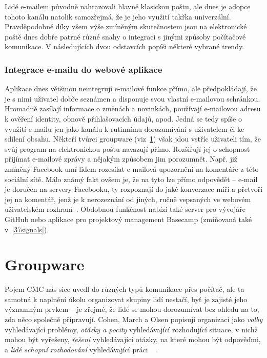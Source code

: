 \documentclass[12pt,oneside,final]{fithesis2}
\begin{document}
Lidé e-mailem původně nahrazovali hlavně klasickou poštu, ale dnes je adopce tohoto kanálu natolik samozřejmá, že je jeho využití takřka univerzální. Pravděpodobně díky všem výše zmíněným skutečnostem jsou na elektronické poště dnes dobře patrné různé snahy o integraci s jinými způsoby počítačové komunikace. V následujících dvou odstavcích popíši některé vybrané trendy.

\subsubsection*{Integrace e-mailu do webové aplikace}\label{emailWebApp}
Aplikace dnes většinou neintegrují e-mailové funkce přímo, ale předpokládají, že je s nimi uživatel dobře seznámen a disponuje svou vlastní e-mailovou schránkou. Hromadně zasílají informace o změnách a novinkách, používají e-mailovou adresu k ověření identity, obnově přihlašovacích údajů, apod. Jedná se tedy spíše o využití e-mailu jen jako kanálu k rutinnímu dorozumívání s uživatelem či ke sdílení obsahu. Někteří tvůrci groupware (viz~\ref{groupware}) však jdou vstříc uživateli tím, že svůj program na elektronickou poštu navazují přímo. Rozšiřují jej o schopnost přijímat e-mailové zprávy a nějakým způsobem jim porozumnět. Např. již zmíněný Facebook umí lidem rozesílat e-mailová upozornění na komentáře z této sociální sítě. Málo známý fakt ovšem je, že na tyto lze přímo odpovědět -- e-mail je doručen na servery Facebooku, ty rozpoznají do jaké konverzace míří a přetvoří jej na komentář, jenž je k nerozeznání od jiných, ručně vepsaných ve webovém uživatelském rozhraní~\cite{whitnah2010replying}. Obdobnou funkčnost nabízí také server pro vývojáře GitHub nebo aplikace pro projektový management Basecamp (zmiňovaná také v~\ref{37signals}).


\section{Groupware}\label{groupware}
Pojem CMC nás sice uvedl do různých typů komunikace přes počítač, ale ta samotná k naplnění úkolu organizovat skupiny lidí nestačí, byť je zajisté jeho významným prvkem -- je zřejmé, že lidé se mohou dorozumívat bez ohledu na to, zda něco společně připravují. Cohen, March a Olsen popisují organizaci jako \emph{volby} vyhledávající problémy, \emph{otázky a pocity} vyhledávající rozhodující situace, v nichž mohou být vyřešeny, \emph{řešení} vyhledávající otázky, na které mohou být odpověďmi, a \emph{lidé schopní rozhodování} vyhledávající práci~\cite{cohen1972garbage}~\cite{grudin1994groupware}.
\end{document}
